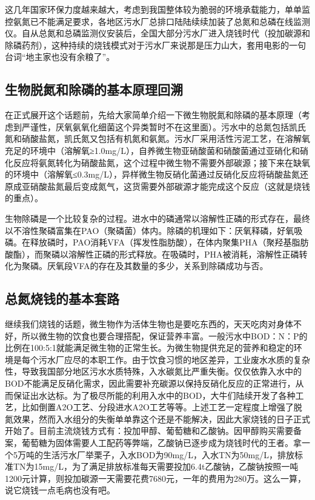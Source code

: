 \documentclass[
]{book}
\begin{document}
这几年国家环保力度越来越大，考虑到我国整体较为脆弱的环境承载能力，单单监控氨氮已不能满足要求，各地区污水厂总排口陆陆续续加装了总氮和总磷在线监测仪。自从总氮和总磷监测仪安装后，全国大部分污水厂进入烧钱时代（投加碳源和除磷药剂），这种持续的烧钱模式对于污水厂来说那是压力山大，套用电影的一句台词``地主家也没有余粮了''。

\hypertarget{ux751fux7269ux8131ux6c2eux548cux9664ux78f7ux7684ux57faux672cux539fux7406ux56deux6eaf}{%
\subsection{生物脱氮和除磷的基本原理回溯}\label{ux751fux7269ux8131ux6c2eux548cux9664ux78f7ux7684ux57faux672cux539fux7406ux56deux6eaf}}

在正式展开这个话题前，先给大家简单介绍一下微生物脱氮和除磷的基本原理（考虑到严谨性，厌氧氨氧化细菌这个异类暂时不在这里面）。污水中的总氮包括凯氏氮和硝酸盐氮，凯氏氮又包括有机氮和氨氮。污水厂采用活性污泥工艺，在溶解氧充足的环境中（溶解氧≥1.0mg/L），自养微生物亚硝酸菌和硝酸菌通过亚硝化和硝化反应将氨氮转化为硝酸盐氮，这个过程中微生物不需要外部碳源；接下来在缺氧的环境中（溶解氧≤0.3mg/L），异样微生物反硝化菌通过反硝化反应将硝酸盐氮还原成亚硝酸盐氮最后变成氮气，这货需要外部碳源才能完成这个反应（这就是烧钱的重点）。

生物除磷是一个比较复杂的过程。进水中的磷通常以溶解性正磷的形式存在，最终以不溶性聚磷富集在PAO（聚磷菌）体内。除磷的机理如下：厌氧释磷，好氧吸磷。在释放磷时，PAO消耗VFA（挥发性脂肪酸），在体内聚集PHA（聚羟基脂肪酸酯），而聚磷以溶解性正磷的形式释放。在吸磷时，PHA被消耗，溶解性正磷转化为聚磷。厌氧段VFA的存在及其数量的多少，关系到除磷成功与否。

\hypertarget{ux603bux6c2eux70e7ux94b1ux7684ux57faux672cux5957ux8def}{%
\subsection{总氮烧钱的基本套路}\label{ux603bux6c2eux70e7ux94b1ux7684ux57faux672cux5957ux8def}}

继续我们烧钱的话题，微生物作为活体生物也是要吃东西的，天天吃肉对身体不好，所以微生物的饮食也要合理搭配，保证营养丰富。一般污水中BOD：N：P的比例在100:5:1就能满足微生物的正常生长。为微生物提供充足的营养和稳定的环境是每个污水厂应尽的本职工作。由于饮食习惯的地区差异，工业废水水质的复杂性，导致我国部分地区污水水质特殊，入水碳氮比严重失衡。仅仅依靠入水中的BOD不能满足反硝化需求，因此需要补充碳源以保持反硝化反应的正常进行，从而保证出水达标。为了极尽所能的利用入水中的BOD，大牛们陆续开发了各种工艺，比如倒置A2O工艺、分段进水A2O工艺等等。上述工艺一定程度上增强了脱氮效果，然而入水组分的失衡单单靠这个还是不能解决，因此大家烧钱的日子正式开始了。目前主流烧钱方式有：投加甲醇、葡萄糖和乙酸钠。因甲醇购买需要备案，葡萄糖为固体需要人工配药等弊端，乙酸钠已逐步成为烧钱时代的王者。拿一个5万吨的生活污水厂举栗子，入水BOD为90mg/L，入水TN为50mg/L，排放标准TN为15mg/L，为了满足排放标准每天需要投加6.4t乙酸钠，乙酸钠按照一吨1200元计算，则投加碳源一天需要花费7680元，一年的费用为280万。这么一算，说它烧钱一点毛病也没有吧。
\end{document}
